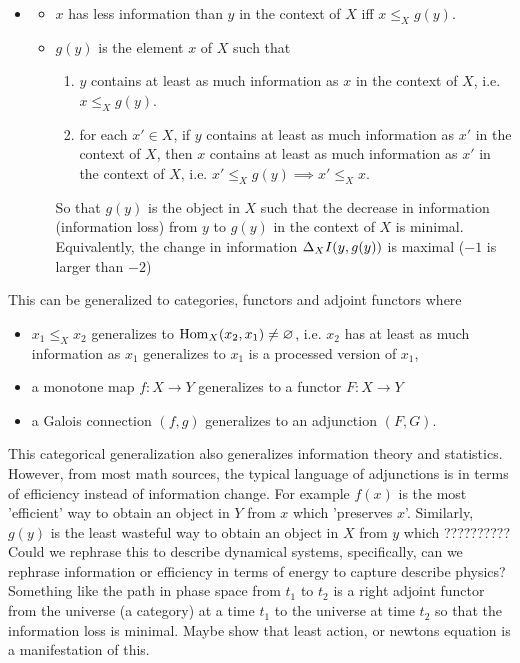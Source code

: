 \documentclass{book}
\begin{document}
{\begin{itemize}
\begin{itemize}
\begin{itemize}
				\end{itemize}
				\item 
				\begin{itemize}
					\item $x$ has less information than $y$ in the context of $X$ iff $x \leq_X g(y)$.
					\item $g(y)$ is the element $x$ of $X$ such that 
					\begin{enumerate}
						\item $y$ contains at least as much information as $x$ in the context of $X$, i.e. $x \leq_X g(y)$.
						\item for each $x' \in X$, if $y$ contains at least as much information as $x'$ in the context of $X$, then $x$ contains at least as much information as $x'$ in the context of $X$, i.e. $x' \leq_X g(y) \implies x' \leq_X x$.  
					\end{enumerate} 
					So that $g(y)$ is the object in $X$ such that the decrease in information (information loss) from $y$ to $g(y)$ in the context of $X$ is minimal. Equivalently, the change in information $\Delta_XI(y, g(y))$ is maximal ($-1$ is larger than $-2$)
				\end{itemize}
			\end{itemize}
		\end{itemize}
		This can be generalized to categories, functors and adjoint functors where 
		\begin{itemize}
			\item $x_1 \leq_X x_2$ generalizes to $\operatorname{Hom}_{X}(x_2, x_1) \neq \varnothing$, i.e. $x_2$ has at least as much information as $x_1$ generalizes to $x_1$ is a processed version of $x_1$,
			\item a monotone map $f:X \rightarrow Y$ generalizes to a functor $F: X \rightarrow Y$
			\item a Galois connection $(f,g)$ generalizes to an adjunction $(F, G)$. 
		\end{itemize}
		This categorical generalization also generalizes information theory and statistics. However, from most math sources, the typical language of adjunctions is in terms of efficiency instead of information change. For example $f(x)$ is the most 'efficient' way to obtain an object in $Y$ from $x$ which 'preserves $x$'. Similarly, $g(y)$ is the least wasteful way to obtain an object in $X$ from $y$ which ?????????? \\
		Could we rephrase this to describe dynamical systems, specifically, can we rephrase information or efficiency in terms of energy to capture describe physics? Something like the path in phase space from $t_1$ to $t_2$ is a right adjoint functor from the universe (a category) at a time $t_1$ to the universe at time $t_2$ so that the information loss is minimal. Maybe show that least action, or newtons equation is a manifestation of this.}
	
\end{document}
